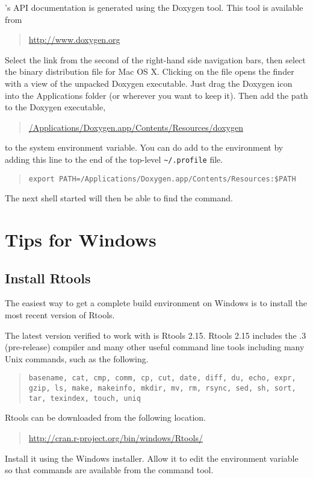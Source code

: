 \Stan's API documentation is generated using the Doxygen tool.   This
tool is available from
%
\begin{quote}
\url{http://www.doxygen.org}
\end{quote}
%
Select the  link from the second of the right-hand side
navigation bars, then select the binary distribution  file
for Mac OS X.  Clicking on the  file opens the finder with
a view of the unpacked Doxygen executable.  Just drag the Doxygen icon
into the Applications folder (or wherever you want to keep it).  Then
add the path to the Doxygen executable, 
%
\begin{quote}
\url{/Applications/Doxygen.app/Contents/Resources/doxygen}
\end{quote}
%
to the system  environment variable.  You can do add to the
 environment by adding this line to the end of the
top-level \Verb|~/.profile| file.  
%
\begin{quote}
\begin{Verbatim}
export PATH=/Applications/Doxygen.app/Contents/Resources:$PATH
\end{Verbatim}
\end{quote}
%
The next shell started will then be able to find the  command.


\section{Tips for Windows}

\subsection{Install Rtools}

The easiest way to get a complete \Cpp build environment on Windows is
to install the most recent version of Rtools.  

The latest version verified to work with \Stan is Rtools 2.15.  Rtools
2.15 includes the .3 (pre-release) compiler and many other
useful command line tools including many Unix commands, such as the
following.
%
\begin{quote}
\tt basename, cat, cmp, comm, cp, cut, date,
diff, du, echo, expr, gzip, ls, make, makeinfo, mkdir, mv, rm, rsync,
sed, sh, sort, tar, texindex, touch, uniq
\end{quote}

Rtools can be downloaded from the following location.
%
\begin{quote}
  \url{http://cran.r-project.org/bin/windows/Rtools/}
\end{quote}
%
Install it using the Windows installer.  Allow it to edit the
 environment variable so that commands are available from
the command tool.

